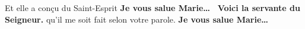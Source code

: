 \rb Et elle a conçu du Saint-Esprit
\textbf{Je vous salue Marie…}
\textbf{\vb~Voici la servante du Seigneur.}
\rb qu’il me soit fait selon votre parole.
\textbf{Je vous salue Marie…}

